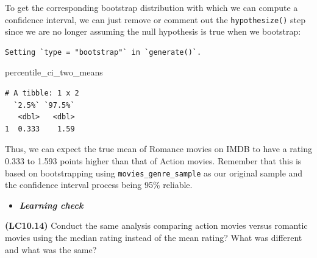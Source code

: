 \documentclass[12pt, krantz2,]{krantz}
\makeatletter
\newenvironment{Shaded}{\begin{snugshade}}{\end{snugshade}}
\newcommand{\CommentTok}[1]{\textcolor[rgb]{0.37,0.37,0.37}{\textit{#1}}}
\newcommand{\DataTypeTok}[1]{\textcolor[rgb]{0.27,0.27,0.27}{#1}}
\newcommand{\DecValTok}[1]{\textcolor[rgb]{0.06,0.06,0.06}{#1}}
\newcommand{\KeywordTok}[1]{\textcolor[rgb]{0.27,0.27,0.27}{\textbf{#1}}}
\newcommand{\NormalTok}[1]{#1}
\newcommand{\OperatorTok}[1]{\textcolor[rgb]{0.43,0.43,0.43}{\textbf{#1}}}
\newcommand{\StringTok}[1]{\textcolor[rgb]{0.5,0.5,0.5}{#1}}
\newenvironment{kframe}{%
\medskip{}
\setlength{\fboxsep}{.8em}
 \def\at@end@of@kframe{}%
 \ifinner\ifhmode%
  \def\at@end@of@kframe{\end{minipage}}%
  \begin{minipage}{\columnwidth}%
 \fi\fi%
 \def\FrameCommand##1{\hskip\@totalleftmargin \hskip-\fboxsep
 \colorbox{shadecolor}{##1}\hskip-\fboxsep
     \hskip-\linewidth \hskip-\@totalleftmargin \hskip\columnwidth}%
 \MakeFramed {\advance\hsize-\width
   \@totalleftmargin\z@ \linewidth\hsize
   \@setminipage}}%
 {\par\unskip\endMakeFramed%
 \at@end@of@kframe}
\renewenvironment{Shaded}{\begin{kframe}}{\end{kframe}}
\newenvironment{rmdblock}[1]
  {\begin{shaded*}
  \begin{itemize}
  \renewcommand{\labelitemi}{
    \raisebox{-.7\height}[0pt][0pt]{
    }
  }
  \item
  }
  {
  \end{itemize}
  \end{shaded*}
  }
\newenvironment{learncheck}
  {\begin{rmdblock}{warning}}
  {\end{rmdblock}}
\makeatother
\begin{document}
To get the corresponding bootstrap distribution with which we can compute a confidence interval, we can just remove or comment out the \texttt{hypothesize()} step since we are no longer assuming the null hypothesis is true when we bootstrap:

\begin{Shaded}
\end{Shaded}

\begin{verbatim}
Setting `type = "bootstrap"` in `generate()`.
\end{verbatim}

\begin{Shaded}
\begin{Highlighting}[]
\NormalTok{percentile_ci_two_means}
\end{Highlighting}
\end{Shaded}

\begin{verbatim}
# A tibble: 1 x 2
  `2.5%` `97.5%`
   <dbl>   <dbl>
1  0.333    1.59
\end{verbatim}

Thus, we can expect the true mean of Romance movies on IMDB to have a rating 0.333 to 1.593 points higher than that of Action movies. Remember that this is based on bootstrapping using \texttt{movies\_genre\_sample} as our original sample and the confidence interval process being 95\% reliable.

\begin{learncheck}
\textbf{\emph{Learning check}}
\end{learncheck}

\textbf{(LC10.14)} Conduct the same analysis comparing action movies versus romantic movies using the median rating instead of the mean rating? What was different and what was the same?
\end{document}
